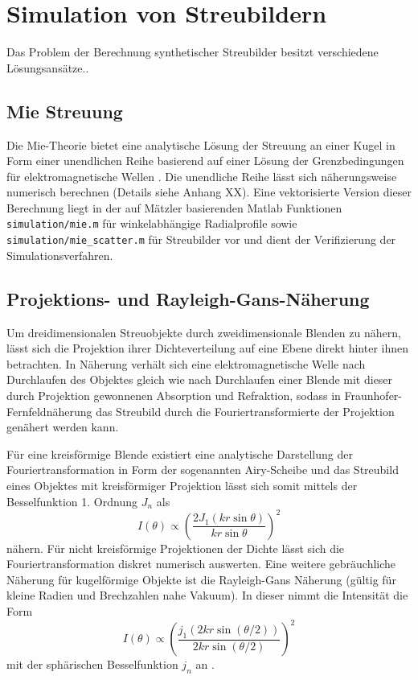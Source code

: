 \chapter{Simulation von Streubildern}
Das Problem der Berechnung synthetischer Streubilder besitzt verschiedene Lösungsansätze..
\section{Mie Streuung}
Die Mie-Theorie bietet eine analytische Lösung der Streuung an einer Kugel  in Form einer unendlichen Reihe basierend auf einer Lösung der Grenzbedingungen für elektromagnetische Wellen \cite{bohren2008}. Die unendliche Reihe lässt sich näherungsweise numerisch berechnen (Details siehe Anhang XX).
Eine vektorisierte Version dieser Berechnung liegt in der auf Mätzler \cite{maetzler2002} basierenden Matlab Funktionen \texttt{simulation/mie.m} für winkelabhängige Radialprofile sowie \texttt{simulation/mie\_scatter.m} für Streubilder vor und dient der Verifizierung der Simulationsverfahren.

\section{Projektions- und Rayleigh-Gans-Näherung}
	
Um dreidimensionalen Streuobjekte durch zweidimensionale Blenden zu nähern, lässt sich die Projektion ihrer Dichteverteilung auf eine Ebene direkt hinter ihnen betrachten. In Näherung verhält sich eine elektromagnetische Welle nach Durchlaufen des Objektes gleich wie nach Durchlaufen einer Blende mit dieser durch Projektion gewonnenen Absorption und Refraktion, sodass in Fraunhofer-Fernfeldnäherung das Streubild durch die Fouriertransformierte der Projektion genähert werden kann.
	
Für eine kreisförmige Blende existiert eine analytische Darstellung der Fouriertransformation in Form der sogenannten Airy-Scheibe und das Streubild eines Objektes mit kreisförmiger Projektion lässt sich somit mittels der Besselfunktion 1. Ordnung $J_n$ als
\begin{equation}
	I(\theta) \propto \left ( \frac{2 J_1(kr \sin \theta)}{kr \sin \theta} \right )^2 
\end{equation}
nähern\cite{born1980}. Für nicht kreisförmige Projektionen der Dichte lässt sich die Fouriertransformation diskret numerisch auswerten.
Eine weitere gebräuchliche Näherung für kugelförmige Objekte ist die Rayleigh-Gans Näherung (gültig für kleine Radien und Brechzahlen nahe Vakuum). In dieser nimmt die Intensität die Form
\begin{equation}
	I(\theta)\propto\left ( \frac{j_1(2kr\sin(\theta/2))}{2kr\sin(\theta/2)} \right )^2 
\end{equation}
mit der sphärischen Besselfunktion $j_n$ an \cite{bohren2008}. 


